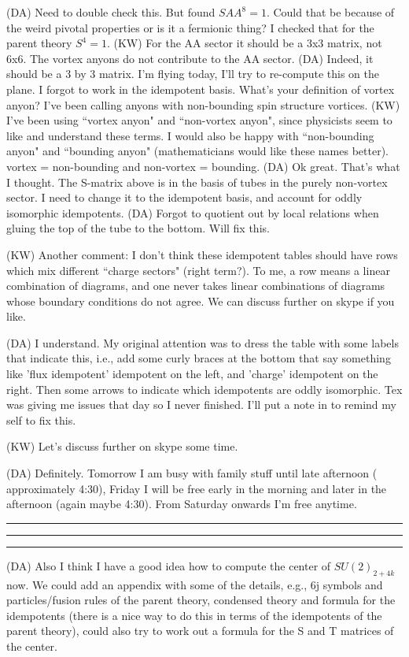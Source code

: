 \documentclass[12pt,a4paper]{article}
\newcounter{brace}
\newcounter{arrow}
\newcommand{\dave}[1]{{\color{ao(english)}\footnotesize{(DA) #1}}}
\newcommand{\kw}[1]{{\color{kwcolor}\footnotesize{(KW) #1}}}
\newcommand{\kwsep}{\bigskip\hrule\medskip\hrule\medskip\hrule\bigskip}
\begin{document}
\dave{Need to double check this. But found $S{AA}^8 = 1$. Could that be because of the weird pivotal properties or is it a fermionic thing? I checked that for the parent theory $S^4 = 1$.  }
\kw{For the AA sector it should be a 3x3 matrix, not 6x6.  The vortex anyons do not contribute to the AA sector.}
\dave{Indeed, it should be a 3 by 3 matrix. I'm flying today, I'll try to re-compute this on the plane. I forgot to work in the idempotent basis. What's your definition of vortex anyon? I've been calling anyons with non-bounding spin structure vortices.}
\kw{I've been using ``vortex anyon" and ``non-vortex anyon", since physicists seem to like and understand these terms.
I would also be happy with ``non-bounding anyon" and ``bounding anyon" (mathematicians would like these names better).
vortex = non-bounding and non-vortex = bounding.}
\dave{Ok great. That's what I thought. The S-matrix above is in the basis of tubes in the purely non-vortex sector. I need to change it to the idempotent basis, and account for oddly isomorphic idempotents.}
\dave{Forgot to quotient out by local relations when gluing the top of the tube to the bottom. Will fix this.}

\kw{Another comment: I don't think these idempotent tables should have rows which mix different ``charge sectors" (right term?).
To me, a row means a linear combination of diagrams, and one never takes linear combinations of diagrams whose boundary
conditions do not agree.
We can discuss further on skype if you like.}

\dave{I understand. My original attention was to dress the table with some labels that indicate this, i.e., add some curly braces at the bottom that say something like 'flux idempotent' idempotent on the left, and 'charge' idempotent on the right. Then some arrows to indicate which idempotents are oddly isomorphic. Tex was giving me issues that day so I never finished. I'll put a note in to remind my self to fix this.}

\kw{Let's discuss further on skype some time.}

\dave{Definitely. Tomorrow I am busy with family stuff until late afternoon ( approximately 4:30), Friday I will be free early in the morning and later in the afternoon (again maybe 4:30). From Saturday onwards I'm free anytime. }

\kwsep


\dave{Also I think I have a good idea how to compute the center of $SU(2)_{2+4k}$ now. 
We could add an appendix with some of the details, e.g., 6j symbols and particles/fusion rules of the parent theory, condensed theory and formula for the idempotents (there is a nice way to do this in terms of the idempotents of the parent theory), could also try to work out a formula for the S and T matrices of the center.}
\end{document}
